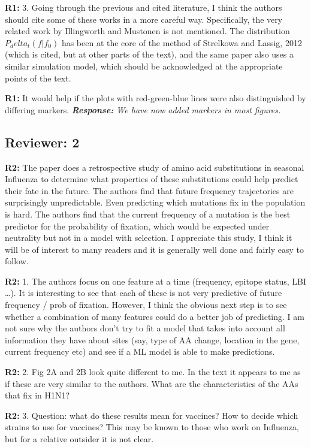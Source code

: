 \documentclass[aps,rmp,onecolumn]{revtex4-1}
\newcommand{\refa}[1]{\textbf{R1:} #1\vskip 5mm}
\newcommand{\refb}[1]{\textbf{R2:} #1\vskip 5mm}
\newcommand{\response}[1]{{\it {\color{response}\textbf{Response:} #1}}\vskip 5mm}
\begin{document}
\refa{3. Going through the previous and cited literature, I think the authors should cite some of these works in a more careful way. Specifically, the very related work by Illingworth and Mustonen is not mentioned. The distribution $P_delta_t(f|f_0)$ has been at the core of
the method of Strelkowa and Lassig, 2012 (which is cited, but at other
parts of the text), and the same paper also uses a similar simulation model, which should be acknowledged at the appropriate points of the text.}

\refa{It would help if the plots with red-green-blue lines were also distinguished by differing markers.}
\response{We have now added markers in most figures.}


\subsection*{Reviewer: 2}

\refb{The paper does a retrospective study of amino acid substitutions in seasonal Influenza to determine what properties of these substitutions could help predict their fate in the future. The authors find that future frequency trajectories are surprisingly unpredictable. Even predicting which mutations fix in the population is hard. The authors find that the current frequency of a mutation is the best predictor for the probability of fixation, which would be expected under neutrality but not in a model with selection. 
I appreciate this study, I think it will be of interest to many readers and it is generally well done and fairly easy to follow. 
}

\refb{1. The authors focus on one feature at a time (frequency, epitope status, LBI …). It is interesting to see that each of these is not very predictive of future frequency / prob of fixation. However, I think the obvious next step is to see whether a combination of many features could do a better job of predicting. I am not sure why the authors don’t try to fit a model that takes into account all information they have about sites (say, type of AA change, location in the gene, current frequency etc) and see if a ML model is able to make predictions. }

\refb{2. Fig 2A and 2B look quite different to me. In the text it appears to me as if these are very similar to the authors. What are the characteristics of the AAs that fix in H1N1? }

\refb{3. Question: what do these results mean for vaccines? How to decide which strains to use for vaccines? This may be known to those who work on Influenza, but for a relative outsider it is not clear. }
\end{document}
